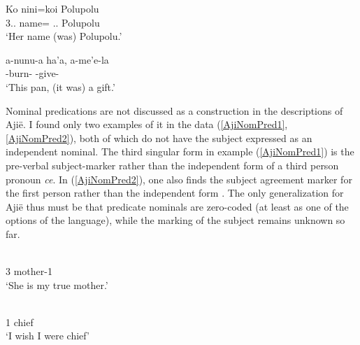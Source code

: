 \begin{exe}\ex\label{SavoNomPredZeroS}
\gll Ko nini=koi Polupolu\\
3\sg{}.\fem{}.\gen{} name=\emphat{} \deter{}.\sg{}.\fem{} Polupolu\\
\glt `Her name (was) Polupolu.'
\end{exe}


\begin{exe}
\ex\label{NiaNomPredZeroS}
\gll a-nunu-a ha'a, a-me'e-la\\
\ipfv{}-burn-\nmlz{} \prox{} \ipfv{}-give-\nmlz{}\\
\glt `This pan, (it was) a gift.'
\end{exe}

Nominal predications are not discussed as a construction in the descriptions of Aji\"e. 
I found only two examples of it in the data (\ref{AjiNomPred1}, \ref{AjiNomPred2}), both of which do not have the subject expressed as an independent nominal.
The third singular form in example (\ref{AjiNomPred1}) is the pre-verbal subject-marker rather than the independent form of a third person pronoun \emph{ce}. 
In (\ref{AjiNomPred2}), one also finds the subject agreement marker for the first person rather than the independent form \emph{}.
The only generalization for Aji\"e thus must be that predicate nominals are zero-coded (at least as one of the options of the language), while the marking of the subject remains unknown so far.  


\begin{exe}\ex\label{AjiNomPred1}
\begin{xlist}
\ex\gll {}  \\
3\sg{} \intens{} mother-1\sg{}\\
\glt `She is my true mother.'
 
\ex\label{AjiNomPred2}\gll {\rm (}  \\
\Hyp{} 1\sg{} chief\\
\glt `I wish I were chief'
\end{xlist} 
\end{exe}


